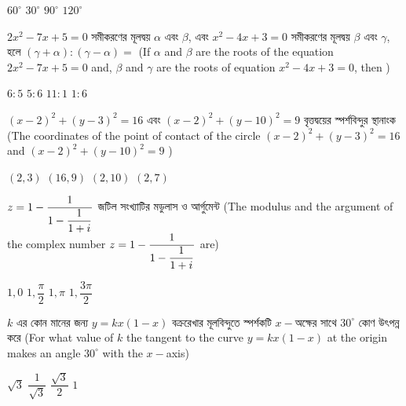 \documentclass[addpoints]{exam}
\begin{document}
\begin{questions}
\begin{oneparchoices}
\choice $ 60^{\circ} $
\choice $ 30^{\circ} $
\choice $ 90^{\circ} $
\choice  $ 120^{\circ} $

\end{oneparchoices}

\question  $ 2x^{2}-7x+5 =0 $ সমীকরণের মূলদ্বয় $ \alpha $ এবং $ \beta $, এবং $ x^{2}-4x+3 =0 $ সমীকরণের মূলদ্বয় $ \beta $ এবং $ \gamma $, হলে $ (\gamma+\alpha):(\gamma -\alpha)= $ (If $ \alpha $ and $ \beta $ are the roots of the equation  $ 2x^{2}-7x+5 =0 $ and, $ \beta $ and $ \gamma $ are the roots of equation  $ x^{2}-4x+3 =0 $, then )


\begin{oneparchoices}
\choice $ 6:5 $
\choice $ 5:6 $
\choice $ 11:1 $
\choice  $ 1:6 $

\end{oneparchoices}

\question $ (x-2)^{2} + (y-3)^{2} = 16 $  এবং $ (x-2)^{2} + (y-10)^{2} = 9 $ বৃত্তদ্বয়ের স্পর্শবিন্দুর স্থানাংক (The coordinates of the point of contact of the circle $ (x-2)^{2} + (y-3)^{2} = 16 $ and $ (x-2)^{2} + (y-10)^{2} = 9 $ )

\begin{oneparchoices}
\choice $ (2,3) $
\choice $ (16,9) $
\choice $ (2,10) $
\choice  $ (2,7) $

\end{oneparchoices}

\question $ \mathlarger{z = 1-\dfrac{1}{1-\dfrac{1}{1+i}}} $ জটিল সংখ্যাটির মডুলাস ও আর্গুমেন্ট (The modulus and the argument of the complex number $ \mathlarger{z = 1-\dfrac{1}{1-\dfrac{1}{1+i}}} $ are)

\begin{oneparchoices}
\choice $1,0$
\choice $ 1, \dfrac{\pi}{2} $
\choice $ 1,\pi $
\choice  $ 1, \dfrac{3\pi}{2} $

\end{oneparchoices}

\question  $ k $  এর কোন মানের জন্য $ y =kx(1-x) $ বক্ররেখার মূলবিন্দুতে স্পর্শকটি $ x- $অক্ষের সাথে $ 30^{\circ} $ কোণ উৎপন্ন করে (For what value of $ k $ the tangent to the curve $ y =kx(1-x) $ at the origin makes an angle $ 30^{\circ} $ with the $x-$axis)

\begin{oneparchoices}
\choice $ \sqrt{3} $
\choice $ \dfrac{1}{\sqrt{3}} $
\choice $ \dfrac{\sqrt{3}}{2} $
\choice  $ 1 $

\end{oneparchoices}


\end{questions}
\end{document}
